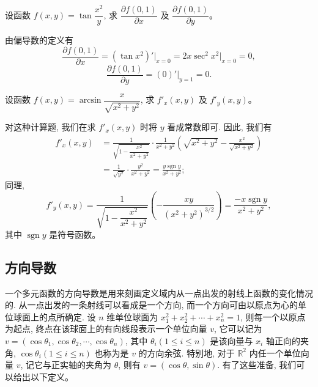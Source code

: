 \documentclass[UTF8,12pt,a4paper,fontset=fandol]{ctexart}
\begin{document}
\begin{example}\label{course-example-14-1-1}\quad 设函数 $f(x,y)=\tan\dfrac{x^2}{y}$, 求 $\dfrac{\partial f(0,1)}{\partial x}$ 及 $\dfrac{\partial f(0,1)}{\partial y}$。

\end{example}
\begin{solve}\quad 由偏导数的定义有
\[
  \frac{\partial f(0,1)}{\partial x}
  =(\tan x^2)'\big|_{x=0}
  =2x\sec^2 x^2\big|_{x=0}=0,
\]
\[
  \frac{\partial f(0,1)}{\partial y}
  =(0)'\big|_{y=1}=0.
\]

\end{solve}
\begin{example}\label{course-example-14-1-2}\quad 设函数 $f(x,y)=\arcsin\dfrac{x}{\sqrt{x^2+y^2}}$, 求 $f'_x(x,y)$ 及 $f'_y(x,y)$。

\end{example}
\begin{solve}\quad 对这种计算题, 我们在求 $f'_x(x,y)$ 时将 $y$ 看成常数即可. 因此, 我们有
\[
\begin{aligned}
  f'_x(x,y)
  &=
  \frac{1}{\sqrt{1-\dfrac{x^2}{x^2+y^2}}}\cdot
  \frac{1}{x^2+y^2}
  \left(\sqrt{x^2+y^2}-\frac{x^2}{\sqrt{x^2+y^2}}\right)\\
  &=\frac{1}{\sqrt{y^2}}\cdot\frac{y^2}{x^2+y^2}
  =\frac{y\operatorname{sgn} y}{x^2+y^2};
\end{aligned}
\]
同理,
\[
  f'_y(x,y)
  =
  \frac{1}{\sqrt{1-\dfrac{x^2}{x^2+y^2}}}
  \left(-\frac{xy}{(x^2+y^2)^{3/2}}\right)
  =\frac{-x\operatorname{sgn} y}{x^2+y^2},
\]
其中 $\operatorname{sgn} y$ 是符号函数。

\end{solve}
\subsection{方向导数}

一个多元函数的方向导数是用来刻画定义域内从一点出发的射线上函数的变化情况的. 从一点出发的一条射线可以看成是一个方向, 而一个方向可由以原点为心的单位球面上的点所确定. 设 $n$ 维单位球面为 $x_1^2+x_2^2+\cdots+x_n^2=1$, 则每一个以原点为起点, 终点在该球面上的有向线段表示一个单位向量 $v$, 它可以记为 $v=(\cos\theta_1,\cos\theta_2,\cdots,\cos\theta_n)$, 其中 $\theta_i(1\leqslant i\leqslant n)$ 是该向量与 $x_i$ 轴正向的夹角, $\cos\theta_i(1\leqslant i\leqslant n)$ 也称为是 $v$ 的方向余弦. 特别地, 对于 $\mathbb R^2$ 内任一个单位向量 $v$, 记它与正实轴的夹角为 $\theta$, 则有 $v=(\cos\theta,\sin\theta)$. 有了这些准备, 我们可以给出以下定义。
\end{document}
